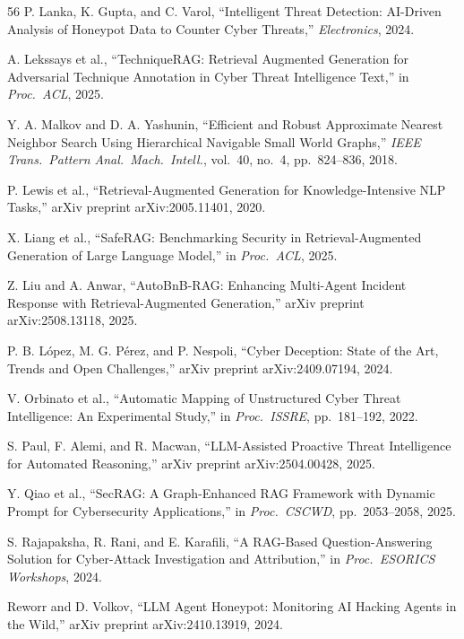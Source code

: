 \begin{thebibliography}{56}
 P. Lanka, K. Gupta, and C. Varol, ``Intelligent Threat Detection: AI-Driven Analysis of Honeypot Data to Counter Cyber Threats,'' \emph{Electronics}, 2024.

 A. Lekssays et al., ``TechniqueRAG: Retrieval Augmented Generation for Adversarial Technique Annotation in Cyber Threat Intelligence Text,'' in \emph{Proc.\ ACL}, 2025.

 Y. A. Malkov and D. A. Yashunin, ``Efficient and Robust Approximate Nearest Neighbor Search Using Hierarchical Navigable Small World Graphs,'' \emph{IEEE Trans.\ Pattern Anal.\ Mach.\ Intell.}, vol.~40, no.~4, pp.~824--836, 2018.

 P. Lewis et al., ``Retrieval-Augmented Generation for Knowledge-Intensive NLP Tasks,'' arXiv preprint arXiv:2005.11401, 2020.

 X. Liang et al., ``SafeRAG: Benchmarking Security in Retrieval-Augmented Generation of Large Language Model,'' in \emph{Proc.\ ACL}, 2025.

 Z. Liu and A. Anwar, ``AutoBnB-RAG: Enhancing Multi-Agent Incident Response with Retrieval-Augmented Generation,'' arXiv preprint arXiv:2508.13118, 2025.

 P. B. L\'opez, M. G. P\'erez, and P. Nespoli, ``Cyber Deception: State of the Art, Trends and Open Challenges,'' arXiv preprint arXiv:2409.07194, 2024.

 V. Orbinato et al., ``Automatic Mapping of Unstructured Cyber Threat Intelligence: An Experimental Study,'' in \emph{Proc.\ ISSRE}, pp.~181--192, 2022.

 S. Paul, F. Alemi, and R. Macwan, ``LLM-Assisted Proactive Threat Intelligence for Automated Reasoning,'' arXiv preprint arXiv:2504.00428, 2025.

 Y. Qiao et al., ``SecRAG: A Graph-Enhanced RAG Framework with Dynamic Prompt for Cybersecurity Applications,'' in \emph{Proc.\ CSCWD}, pp.~2053--2058, 2025.

 S. Rajapaksha, R. Rani, and E. Karafili, ``A RAG-Based Question-Answering Solution for Cyber-Attack Investigation and Attribution,'' in \emph{Proc.\ ESORICS Workshops}, 2024.

 Reworr and D. Volkov, ``LLM Agent Honeypot: Monitoring AI Hacking Agents in the Wild,'' arXiv preprint arXiv:2410.13919, 2024.


\end{thebibliography}
